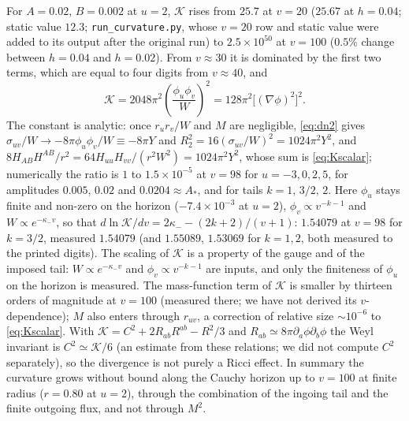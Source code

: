 \documentclass[11pt]{article}
\begin{document}
For $A=0.02$, $B=0.002$ at $u=2$, $\mathcal K$ rises from $25.7$ at $v=20$ ($25.67$ at $h=0.04$; static value $12.3$; \texttt{run\_curvature.py}, whose $v=20$ row and static value were added to its output after the original run) to $2.5\times10^{50}$ at $v=100$ ($0.5\%$ change between $h=0.04$ and $h=0.02$). From $v\approx30$ it is dominated by the first two terms, which are equal to four digits from $v\approx40$, and
\begin{equation}
\mathcal K=2048\pi^2\left(\frac{\phi_u\phi_v}{W}\right)^{2}=128\pi^2\bigl[(\nabla\phi)^2\bigr]^2 .
\label{eq:Kscalar}
\end{equation}
The constant is analytic: once $r_ur_v/W$ and $M$ are negligible, \eqref{eq:dn2} gives $\sigma_{uv}/W\to-8\pi\phi_u\phi_v/W\equiv-8\pi Y$ and $R_2^2=16(\sigma_{uv}/W)^2=1024\pi^2Y^2$, and $8H_{AB}H^{AB}/r^2=64H_{uu}H_{vv}/(r^2W^2)=1024\pi^2Y^2$, whose sum is \eqref{eq:Kscalar}; numerically the ratio is $1$ to $1.5\times10^{-5}$ at $v=98$ for $u=-3,0,2,5$, for amplitudes $0.005$, $0.02$ and $0.0204\approx A_*$, and for tails $k=1,\,3/2,\,2$. Here $\phi_u$ stays finite and non-zero on the horizon ($-7.4\times10^{-3}$ at $u=2$), $\phi_v\propto v^{-k-1}$ and $W\propto e^{-\kappa_-v}$, so that $d\ln \mathcal K/dv=2\kappa_--(2k+2)/(v+1)$: $1.54079$ at $v=98$ for $k=3/2$, measured $1.54079$ (and $1.55089$, $1.53069$ for $k=1,2$, both measured to the printed digits). The scaling of $\mathcal K$ is a property of the gauge and of the imposed tail: $W\propto e^{-\kappa_-v}$ and $\phi_v\propto v^{-k-1}$ are inputs, and only the finiteness of $\phi_u$ on the horizon is measured. The mass-function term of $\mathcal K$ is smaller by thirteen orders of magnitude at $v=100$ (measured there; we have not derived its $v$-dependence); $M$ also enters through $r_{uv}$, a correction of relative size $\sim10^{-6}$ to \eqref{eq:Kscalar}. With $\mathcal K=C^2+2R_{ab}R^{ab}-R^2/3$ and $R_{ab}\simeq8\pi\partial_a\phi\partial_b\phi$ the Weyl invariant is $C^2\simeq \mathcal K/6$ (an estimate from these relations; we did not compute $C^2$ separately), so the divergence is not purely a Ricci effect. In summary the curvature grows without bound along the Cauchy horizon up to $v=100$ at finite radius ($r=0.80$ at $u=2$), through the combination of the ingoing tail and the finite outgoing flux, and not through $M^2$.
\end{document}
